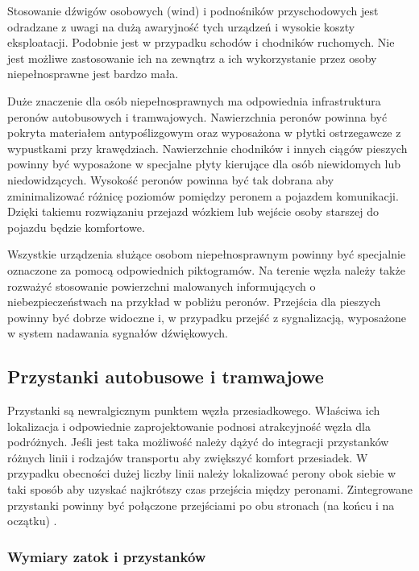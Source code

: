 \documentclass[twoside,12pt]{article}
\begin{document}
	Stosowanie dźwigów osobowych (wind) i podnośników przyschodowych jest odradzane z uwagi na dużą awaryjność tych urządzeń i wysokie koszty eksploatacji. Podobnie jest w przypadku schodów i chodników ruchomych. Nie jest możliwe zastosowanie ich na zewnątrz a ich wykorzystanie przez osoby niepełnosprawne jest bardzo mała. 
	
	Duże znaczenie dla osób niepełnosprawnych ma odpowiednia infrastruktura peronów autobusowych i tramwajowych. Nawierzchnia peronów powinna być pokryta materiałem antypoślizgowym oraz wyposażona w płytki ostrzegawcze z wypustkami przy krawędziach. Nawierzchnie chodników i innych ciągów pieszych powinny być wyposażone w specjalne płyty kierujące dla osób niewidomych lub niedowidzących. Wysokość peronów powinna być tak dobrana aby zminimalizować różnicę poziomów pomiędzy peronem a pojazdem komunikacji. Dzięki takiemu rozwiązaniu przejazd wózkiem lub wejście osoby starszej do pojazdu będzie komfortowe.
	
	Wszystkie urządzenia służące osobom niepełnosprawnym powinny być specjalnie oznaczone za pomocą odpowiednich piktogramów. Na terenie węzła należy także rozważyć stosowanie powierzchni malowanych informujących o niebezpieczeństwach na przykład w pobliżu peronów. Przejścia dla pieszych powinny być dobrze widoczne i, w przypadku przejść z sygnalizacją, wyposażone w system nadawania sygnałów dźwiękowych. 
	 
	 
\subsection{Przystanki autobusowe i tramwajowe}

	Przystanki są newralgicznym punktem węzła przesiadkowego. Właściwa ich lokalizacja i odpowiednie zaprojektowanie podnosi atrakcyjność węzła dla podróżnych. Jeśli jest taka możliwość należy dążyć do integracji przystanków różnych linii i rodzajów transportu aby zwiększyć komfort przesiadek. W przypadku obecności dużej liczby linii należy lokalizować perony obok siebie w taki sposób aby uzyskać najkrótszy czas przejścia między peronami. Zintegrowane przystanki powinny być połączone przejściami po obu stronach (na końcu i na oczątku) \cite{standardy_wroclaw}. 
	
	\subsubsection{Wymiary zatok i przystanków}
\end{document}
